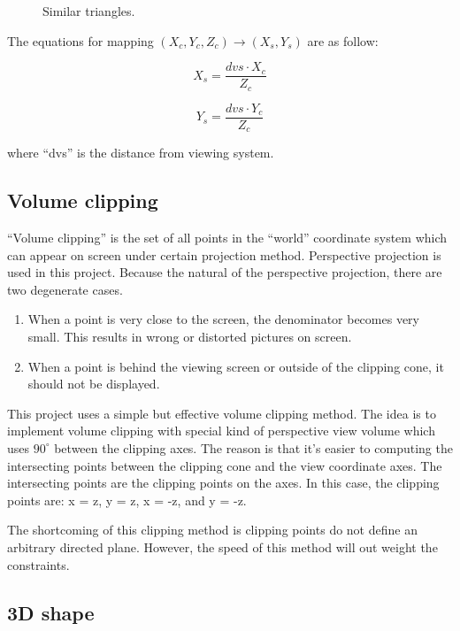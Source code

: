\begin {figure}[htbp]
  \centerline{
  }
  \caption{Similar triangles.}
  \label{fig:persp_view_2d}
\end   {figure}


The equations for mapping $(X_c, Y_c, Z_c) \rightarrow (X_s, Y_s)$ are
as follow:

  \[ X_s = \frac{dvs \cdot X_c}{Z_c} \]

  \[ Y_s = \frac{dvs \cdot Y_c}{Z_c} \]

where ``dvs'' is the distance from viewing system.

\subsection{Volume clipping}

``Volume clipping'' is the set of all points in the ``world''
coordinate system which can appear on screen under certain projection
method.  Perspective projection is used in this project.  Because the
natural of the perspective projection, there are two degenerate cases.

\begin{enumerate}
	\item When a point is very close to the screen, the denominator
		becomes very small.  This results in wrong or distorted
		pictures on screen.
	\item When a point is behind the viewing screen or outside of 
		the clipping cone, it should not be displayed.
\end{enumerate}

This project uses a simple but effective volume clipping method.  The
idea is to implement volume clipping with special kind of perspective
view volume which uses $90^{\circ}$ between the clipping axes.  
The reason is that it's 
easier to computing the intersecting points between the clipping cone
and the view coordinate axes.  The intersecting points
are the clipping points on the axes.  In this case, the clipping
points are: x = z, y = z, x = -z, and y = -z.  

The shortcoming of this clipping method is clipping points do
not define an arbitrary directed plane.  However, the speed of this
method will out weight the constraints.

\subsection{3D shape}

